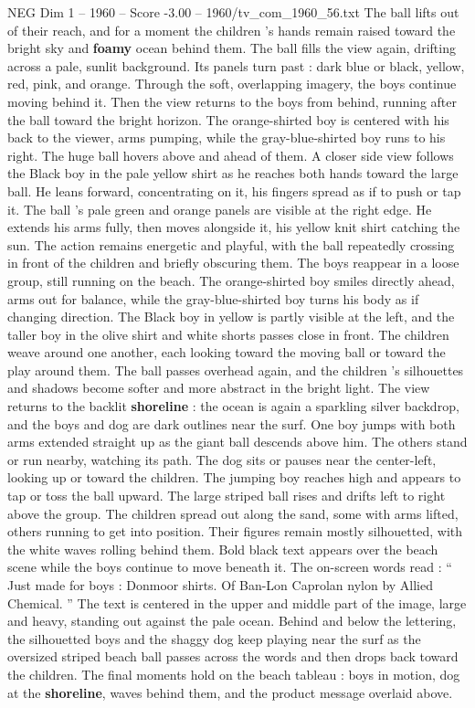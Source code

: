 \begin{textsample}{NEG Dim 1 – 1960 – Score -3.00 – 1960/tv\_com\_1960\_56.txt}
The ball lifts out of their reach, and for a moment the children ’s hands remain raised toward the bright sky and \textbf{foamy} ocean behind them.
The ball fills the view again, drifting across a pale, sunlit background.
Its panels turn past : dark blue or black, yellow, red, pink, and orange.
Through the soft, overlapping imagery, the boys continue moving behind it.
Then the view returns to the boys from behind, running after the ball toward the bright horizon.
The orange-shirted boy is centered with his back to the viewer, arms pumping, while the gray-blue-shirted boy runs to his right.
The huge ball hovers above and ahead of them.
A closer side view follows the Black boy in the pale yellow shirt as he reaches both hands toward the large ball.
He leans forward, concentrating on it, his fingers spread as if to push or tap it.
The ball ’s pale green and orange panels are visible at the right edge.
He extends his arms fully, then moves alongside it, his yellow knit shirt catching the sun.
The action remains energetic and playful, with the ball repeatedly crossing in front of the children and briefly obscuring them.
The boys reappear in a loose group, still running on the beach.
The orange-shirted boy smiles directly ahead, arms out for balance, while the gray-blue-shirted boy turns his body as if changing direction.
The Black boy in yellow is partly visible at the left, and the taller boy in the olive shirt and white shorts passes close in front.
The children weave around one another, each looking toward the moving ball or toward the play around them.
The ball passes overhead again, and the children ’s silhouettes and shadows become softer and more abstract in the bright light.
The view returns to the backlit \textbf{shoreline} : the ocean is again a sparkling silver backdrop, and the boys and dog are dark outlines near the surf.
One boy jumps with both arms extended straight up as the giant ball descends above him.
The others stand or run nearby, watching its path.
The dog sits or pauses near the center-left, looking up or toward the children.
The jumping boy reaches high and appears to tap or toss the ball upward.
The large striped ball rises and drifts left to right above the group.
The children spread out along the sand, some with arms lifted, others running to get into position.
Their figures remain mostly silhouetted, with the white waves rolling behind them.
Bold black text appears over the beach scene while the boys continue to move beneath it.
The on-screen words read : “ Just made for boys : Donmoor shirts.
Of Ban-Lon Caprolan nylon by Allied Chemical. ” The text is centered in the upper and middle part of the image, large and heavy, standing out against the pale ocean.
Behind and below the lettering, the silhouetted boys and the shaggy dog keep playing near the surf as the oversized striped beach ball passes across the words and then drops back toward the children.
The final moments hold on the beach tableau : boys in motion, dog at the \textbf{shoreline}, waves behind them, and the product message overlaid above.

\end{textsample}
